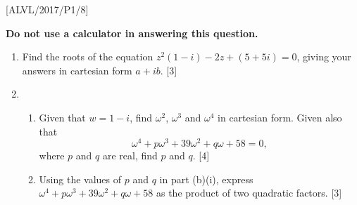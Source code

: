 \item {[}ALVL/2017/P1/8{]}

\textbf{Do not use a calculator in answering this question. }
\begin{enumerate}
\item Find the roots of the equation $z^{2}\left(1-i\right)-2z+\left(5+5i\right)=0$,
giving your answers in cartesian form $a+ib$. \hfill{}{[}3{]}
\item {}
\begin{enumerate}
\item Given that $w=1-i$, find $\omega^{2}$, $\omega^{3}$ and $\omega^{4}$
in cartesian form. Given also that 
\[
\omega^{4}+p\omega^{3}+39\omega^{2}+q\omega+58=0,
\]
 where $p$ and $q$ are real, find $p$ and $q$. \hfill{}{[}4{]}
\item Using the values of $p$ and $q$ in part (b)(i), express $\omega^{4}+p\omega^{3}+39\omega^{2}+q\omega+58$
as the product of two quadratic factors.\hfill{} {[}3{]}
\end{enumerate}
\end{enumerate}
